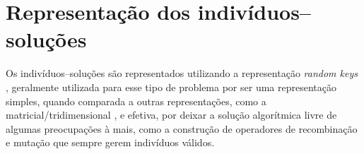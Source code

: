 \documentclass[relatorio,nocolorlinks]{inf-ufg}
\begin{document}
\section{Representa\c{c}\~{a}o dos indiv\'{i}duos--solu\c{c}\~{o}es}

Os indiv\'{i}duos--solu\c{c}\~{o}es s\~{a}o representados utilizando a representa\c{c}\~{a}o \textit{random keys} \cite{Bean1993} \cite{Bean1994}
\cite{Snyder2006}, geralmente utilizada para esse tipo de problema por ser uma representa\c{c}\~{a}o simples, quando comparada a outras
representa\c{c}\~{o}es, como a matricial/tridimensional \cite{Zhang2010b} \cite{Yin2007}, e efetiva, por deixar a solu\c{c}\~{a}o algor\'{i}tmica
livre de algumas preocupa\c{c}\~{o}es \`{a} mais, como a constru\c{c}\~{a}o de operadores de recombina\c{c}\~{a}o e muta\c{c}\~{a}o que sempre
gerem indiv\'{i}duos v\'{a}lidos.
\end{document}
